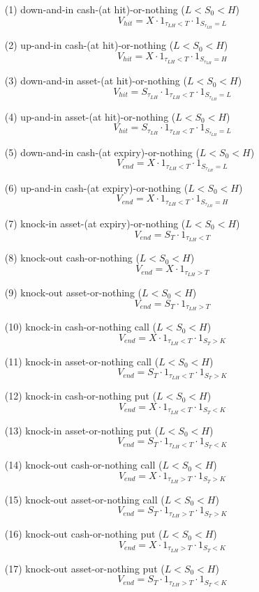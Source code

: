 \begin{enumerate}
\item[(1)] down-and-in cash-(at hit)-or-nothing ($L<S_0<H$)
	\[
		V_{hit} = X \cdot 1_{\tau_{LH} < T} \cdot 1_{S_{\tau_{LH}}=L}
	\]
\item[(2)] up-and-in cash-(at hit)-or-nothing ($L<S_0<H$)
	\[
		V_{hit} = X \cdot 1_{\tau_{LH} < T} \cdot 1_{S_{\tau_{LH}}=H}
	\]
\item[(3)] down-and-in asset-(at hit)-or-nothing ($L<S_0<H$)
	\[
		V_{hit} = S_{\tau_{LH}} \cdot 1_{\tau_{LH} < T} \cdot 1_{S_{\tau_{LH}}=L}
	\]
\item[(4)] up-and-in asset-(at hit)-or-nothing ($L<S_0<H$)
	\[
		V_{hit} = S_{\tau_{LH}} \cdot 1_{\tau_{LH} < T} \cdot 1_{S_{\tau_{LH}}=L}
	\]
\item[(5)] down-and-in cash-(at expiry)-or-nothing ($L<S_0<H$)
	\[
		V_{end} = X \cdot 1_{\tau_{LH} < T} \cdot 1_{S_{\tau_{LH}}=L}
	\]
\item[(6)] up-and-in cash-(at expiry)-or-nothing ($L<S_0<H$)
	\[
		V_{end} = X \cdot 1_{\tau_{LH} < T} \cdot 1_{S_{\tau_{LH}}=H}
	\]
\item[(7)] knock-in asset-(at expiry)-or-nothing ($L<S_0<H$)
	\[
		V_{end} = S_T \cdot 1_{\tau_{LH} < T} 
	\]
\item[(8)] knock-out cash-or-nothing ($L<S_0<H$)
	\[
		V_{end} = X \cdot 1_{\tau_{LH} > T} 
	\]
\item[(9)] knock-out asset-or-nothing ($L<S_0<H$)
	\[
		V_{end} = S_T \cdot 1_{\tau_{LH} > T} 
	\]
\item[(10)] knock-in cash-or-nothing call ($L<S_0<H$)
	\[
		V_{end} = X \cdot 1_{\tau_{LH} < T} \cdot 1_{S_T>K}
	\]
\item[(11)] knock-in asset-or-nothing call ($L<S_0<H$)
	\[
		V_{end} = S_T \cdot 1_{\tau_{LH} < T} \cdot 1_{S_T>K}
	\]
\item[(12)] knock-in cash-or-nothing put ($L<S_0<H$)
	\[
		V_{end} = X \cdot 1_{\tau_{LH} < T} \cdot 1_{S_T<K}
	\]
\item[(13)] knock-in asset-or-nothing put ($L<S_0<H$)
	\[
		V_{end} = S_T \cdot 1_{\tau_{LH} < T} \cdot 1_{S_T<K}
	\]
\item[(14)] knock-out cash-or-nothing call ($L<S_0<H$)
	\[
		V_{end} = X \cdot 1_{\tau_{LH} > T} \cdot 1_{S_T>K}
	\]
\item[(15)] knock-out asset-or-nothing call ($L<S_0<H$)
	\[
		V_{end} = S_T \cdot 1_{\tau_{LH} > T} \cdot 1_{S_T>K}
	\]
\item[(16)] knock-out cash-or-nothing put ($L<S_0<H$)
	\[
		V_{end} = X \cdot 1_{\tau_{LH} > T} \cdot 1_{S_T<K}
	\]
\item[(17)] knock-out asset-or-nothing put ($L<S_0<H$)
	\[
		V_{end} = S_T \cdot 1_{\tau_{LH} > T} \cdot 1_{S_T<K}
	\]
\end{enumerate}
